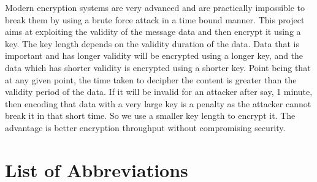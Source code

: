 \documentclass{mainreport}
\begin{document}
{
\label{Abstract}



\hspace{6mm} Modern encryption systems are very advanced and are practically impossible to break them by using a brute force attack in a time bound manner. This project aims at exploiting the validity of the message data and then encrypt it using a key. The key length depends on the validity duration of the data. Data that is important and has longer validity will be encrypted using a longer key, and the data which has shorter validity is encrypted using a shorter key. Point being that at any given point, the time taken to decipher the content is greater than the validity period of the data. If it will be invalid for an attacker after say, 1 minute, then encoding that data with a very large key is a penalty as the attacker cannot break it in that short time. So we use a smaller key length to encrypt it. The advantage is better encryption throughput without compromising security.
}

\tableofcontents


%

%




\listoffigures
{}


\chapter*{List of Abbreviations}\label{abbrv}



\end{document}
